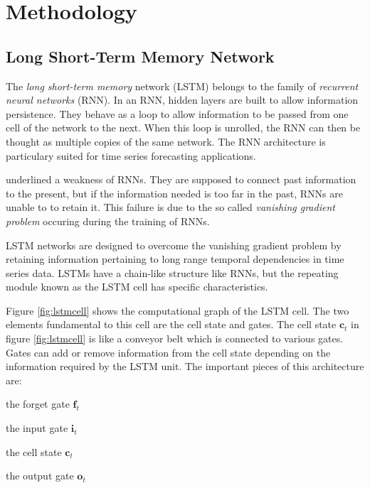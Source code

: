 \section{Methodology}\label{sec:methodgpnn}

\subsection{Long Short-Term Memory Network}\label{sec:lstmintro}

The \emph{long short-term memory} network (LSTM) belongs to the family of \emph{recurrent neural networks} (RNN). 
In an RNN, hidden layers are built to allow information persistence. They behave as a loop to allow information 
to be passed from one cell of the network to the next. When this loop is unrolled, the RNN can then be thought 
as multiple copies of the same network. The RNN architecture is particulary suited for time series forecasting 
applications. 

\citet{hochreiter1991untersuchungen,bengio1994learning} underlined a weakness of RNNs. They are supposed to connect 
past information to the present, but if the information needed is too far in the past, RNNs are unable to to retain it. 
This failure is due to the so called \emph{vanishing gradient problem} occuring during the training of RNNs. 

LSTM networks are designed to overcome the vanishing gradient problem by retaining information pertaining to long range 
temporal dependencies in time series data. LSTMs have a chain-like structure like RNNs, but the repeating module 
known as the LSTM cell has specific characteristics.

Figure \ref{fig:lstmcell} shows the computational graph of the LSTM cell. The two elements 
fundamental to this cell are the cell state and gates. The cell state $\mathbf{c}_{t}$ in figure \ref{fig:lstmcell} 
is like a conveyor belt which is connected to various gates. Gates can add or remove information from the cell 
state depending on the information required by the LSTM unit. The important pieces of this architecture are: 
\begin{itemize*} 
	\item the forget gate $\mathbf{f}_t$ 
	\item the input gate $\mathbf{i}_t$ 
	\item the cell state $\mathbf{c}_t$ 
	\item the output gate $\mathbf{o}_t$  
\end{itemize*}  

